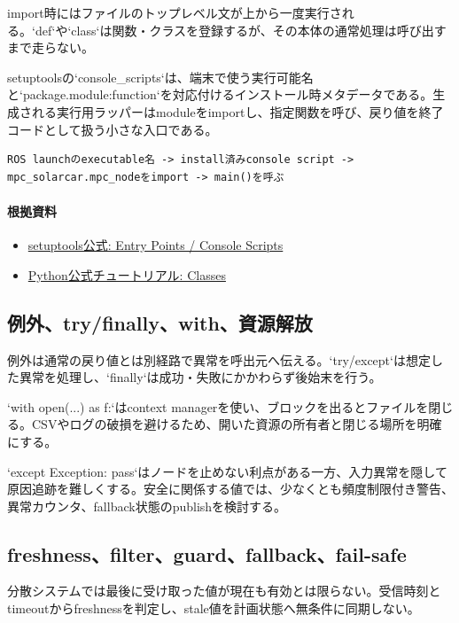 \documentclass[a4paper,11pt]{article}
\begin{document}
import時にはファイルのトップレベル文が上から一度実行される。`def`や`class`は関数・クラスを登録するが、その本体の通常処理は呼び出すまで走らない。


setuptoolsの`console\_scripts`は、端末で使う実行可能名と`package.module:function`を対応付けるインストール時メタデータである。生成される実行用ラッパーはmoduleをimportし、指定関数を呼び、戻り値を終了コードとして扱う小さな入口である。


\begin{lstlisting}
ROS launchのexecutable名 -> install済みconsole script -> mpc_solarcar.mpc_nodeをimport -> main()を呼ぶ
\end{lstlisting}

\paragraph{根拠資料}
\begin{itemize}[leftmargin=1.6em]
\item \href{https://setuptools.pypa.io/en/latest/userguide/entry_point.html}{setuptools公式: Entry Points / Console Scripts}
\item \href{https://docs.python.org/3/tutorial/classes.html}{Python公式チュートリアル: Classes}
\end{itemize}

\subsection{例外、try/finally、with、資源解放}
例外は通常の戻り値とは別経路で異常を呼出元へ伝える。`try/except`は想定した異常を処理し、`finally`は成功・失敗にかかわらず後始末を行う。


`with open(...) as f:`はcontext managerを使い、ブロックを出るとファイルを閉じる。CSVやログの破損を避けるため、開いた資源の所有者と閉じる場所を明確にする。


`except Exception: pass`はノードを止めない利点がある一方、入力異常を隠して原因追跡を難しくする。安全に関係する値では、少なくとも頻度制限付き警告、異常カウンタ、fallback状態のpublishを検討する。



\subsection{freshness、filter、guard、fallback、fail-safe}
分散システムでは最後に受け取った値が現在も有効とは限らない。受信時刻とtimeoutからfreshnessを判定し、stale値を計画状態へ無条件に同期しない。
\end{document}
